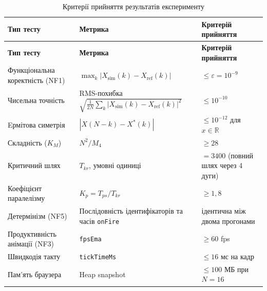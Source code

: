 \documentclass[
]{article}
\newcommand{\passthrough}[1]{#1}
\begin{document}
\begin{longtable}[]{@{}
  >{\raggedright\arraybackslash}p{}
  >{\raggedright\arraybackslash}p{}
  >{\raggedright\arraybackslash}p{}@{}}
\caption[Критерії прийняття результатів експерименту]{Критерії прийняття
результатів експерименту}\tabularnewline
\toprule\noalign{}
\begin{minipage}[b]{\linewidth}\raggedright
\textbf{Тип тесту}
\end{minipage} & \begin{minipage}[b]{\linewidth}\raggedright
\textbf{Метрика}
\end{minipage} & \begin{minipage}[b]{\linewidth}\raggedright
\textbf{Критерій прийняття}
\end{minipage} \\
\midrule\noalign{}
\endfirsthead
\toprule\noalign{}
\begin{minipage}[b]{\linewidth}\raggedright
\textbf{Тип тесту}
\end{minipage} & \begin{minipage}[b]{\linewidth}\raggedright
\textbf{Метрика}
\end{minipage} & \begin{minipage}[b]{\linewidth}\raggedright
\textbf{Критерій прийняття}
\end{minipage} \\
\midrule\noalign{}
\endhead
\bottomrule\noalign{}
\endlastfoot
Функціональна коректність (NF1) &
\(\max_{k}|X_{\text{sim}}(k) - X_{\text{ref}}(k)|\) &
\(\leq \varepsilon = 10^{- 9}\) \\
Чисельна точність & RMS-похибка
\(\sqrt{\frac{1}{2N}\sum_{k}^{}|X_{\text{sim}}(k) - X_{\text{ref}}(k)|^{2}}\)
& \(\leq 10^{- 10}\) \\
Eрмітова симетрія & \(|X(N - k) - X^{*}(k)|\) & \(\leq 10^{- 12}\) для
\(x\mathbb{\in R}\) \\
Складність (\(K_{M}\)) & \(N^{2}/M_{4}\) & \(\geq 28\) \\
Критичний шлях & \(T_{kr}\), умовні одиниці & \(= 3400\) (повний шлях
через 4 дуги) \\
Коефіцієнт паралелізму & \(K_{p} = T_{ps}/T_{kr}\) & \(\geq 1,8\) \\
Детермінізм (NF5) & Послідовність ідентифікаторів та часів
\passthrough{\lstinline!onFire!} & ідентична між двома прогонами \\
Продуктивність анімації (NF3) & \passthrough{\lstinline!fpsEma!} &
\(\geq 60\) fps \\
Швидкодія такту & \passthrough{\lstinline!tickTimeMs!} & \(\leq 16\) мс
на кадр \\
Пам'ять браузера & Heap snapshot & \(\leq 100\) МБ при \(N = 16\) \\
\end{longtable}
\end{document}
